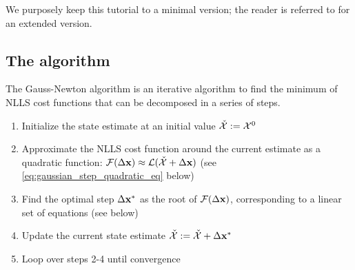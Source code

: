 We purposely keep this tutorial to a minimal version; the reader is referred to \cite{dellaert2017factor,sola2017course} for an extended version.



\subsection{The algorithm}
The Gauss-Newton algorithm is an iterative algorithm to find the minimum of NLLS cost functions that can be decomposed in a series of steps.
\begin{enumerate}
    \item Initialize the state estimate at an initial value $\check{\mathcal{X}} := \mathcal{X}^0$
    \item Approximate the NLLS cost function around the current estimate as a quadratic function:  
    $\mathcal{F}(\Delta {\bf x}) \approx \mathcal{L}(\check{\mathcal{X}} + \Delta {\bf x})$ (see \ref{eq:gaussian_step_quadratic_eq} below)
    \item Find the optimal step $\Delta {\bf x}^*$ as the root of $\mathcal{F}(\Delta {\bf x})$, corresponding to a linear set of 
    equations (see  below)
    \item Update the current state estimate $\check{\mathcal{X}} := \check{\mathcal{X}} + \Delta {\bf x}^*$
    \item Loop over steps 2-4 until convergence
\end{enumerate}







